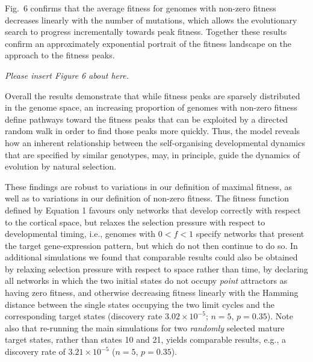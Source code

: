 \documentclass[10pt,letterpaper]{article}
\begin{document}

Fig.~6 confirms that the average fitness for genomes with non-zero fitness decreases linearly with the number of mutations, which allows the evolutionary search to progress incrementally towards peak fitness. Together these results confirm an approximately exponential portrait of the fitness landscape on the approach to the fitness peaks.

\vspace{1em}\emph{\noindent Please insert Figure 6 about here.}\vspace{1em}

Overall the results demonstrate that while fitness peaks are sparsely distributed in the genome space, an increasing proportion of genomes with non-zero fitness define pathways toward the fitness peaks that can be exploited by a directed random walk in order to find those peaks more quickly. Thus, the model reveals how an inherent relationship between the self-organising developmental dynamics that are specified by similar genotypes, may, in principle, guide the dynamics of evolution by natural selection.

These findings are robust to variations in our definition of maximal fitness, as well as to variations in our definition of non-zero fitness. The fitness function defined by Equation 1 favours only networks that develop correctly with respect to the cortical space, but relaxes the selection pressure with respect to developmental timing, i.e., genomes with $0<f<1$ specify networks that present the target gene-expression pattern, but which do not then continue to do so. In additional simulations we found that comparable results could also be obtained by relaxing selection pressure with respect to space rather than time, by declaring all networks in which the two initial states do not occupy \emph{point} attractors as having zero fitness, and otherwise decreasing fitness linearly with the Hamming distance between the single states occupying the two limit cycles and the corresponding target states (discovery rate $3.02\times 10^{-5}$; $n=5$, $p=0.35$). Note also that re-running the main simulations for two \emph{randomly} selected mature target states, rather than states 10 and 21, yields comparable results, e.g., a discovery rate of $3.21\times 10^{-5}$ ($n=5$, $p=0.35$).%
\end{document}
